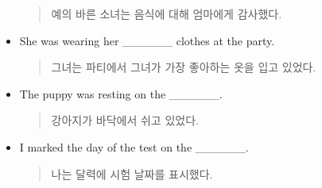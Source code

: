 \documentclass{article}
\begin{document}
\begin{addmargin}[1em]{1em}
\begin{itemize}
    \begin{quote}
    예의 바른 소녀는 음식에 대해 엄마에게 감사했다.
    \end{quote}
    \item She was wearing her \_\_\_\_\_\_ clothes at the party.
    \begin{quote}
    그녀는 파티에서 그녀가 가장 좋아하는 옷을 입고 있었다.
    \end{quote}
    \item The puppy was resting on the \_\_\_\_\_\_.
    \begin{quote}
    강아지가 바닥에서 쉬고 있었다.
    \end{quote}
    \item I marked the day of the test on the \_\_\_\_\_\_.
    \begin{quote}
    나는 달력에 시험 날짜를 표시했다.
    \end{quote}
\end{itemize}
\end{addmargin}
\end{document}
